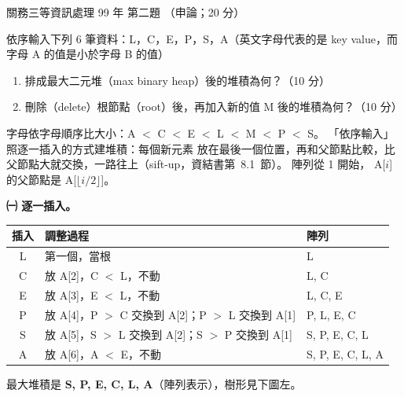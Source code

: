 \begin{pastexam}[label={px:gw3-099-ds-02}]{關務三等資訊處理 99 年 第二題}
（申論；20 分）

依序輸入下列 6 筆資料：L，C，E，P，S，A（英文字母代表的是 key value，而字母 A 的值是小於字母 B 的值）
\begin{enumerate}[leftmargin=2.2em]
\item[㈠] 排成最大二元堆（max binary heap）後的堆積為何？（10 分）
\item[㈡] 刪除（delete）根節點（root）後，再加入新的值 M 後的堆積為何？（10 分）
\end{enumerate}
\end{pastexam}

\begin{pastsoln}
字母依字母順序比大小：A $<$ C $<$ E $<$ L $<$ M $<$ P $<$ S。 「依序輸入」照逐一插入的方式建堆積：每個新元素
放在最後一個位置，再和父節點比較，比父節點大就交換，一路往上（sift-up，資結書第~8.1~節）。 陣列從 1 開始，
A[$i$] 的父節點是 A[$\lfloor i/2 \rfloor$]。

\textbf{㈠ 逐一插入。}
\begin{center}
\begin{tabular}{cll}
\toprule
插入 & 調整過程 & 陣列 \\
\midrule
L & 第一個，當根 & L \\
C & 放 A[2]，C $<$ L，不動 & L, C \\
E & 放 A[3]，E $<$ L，不動 & L, C, E \\
P & 放 A[4]，P $>$ C 交換到 A[2]；P $>$ L 交換到 A[1] & P, L, E, C \\
S & 放 A[5]，S $>$ L 交換到 A[2]；S $>$ P 交換到 A[1] & S, P, E, C, L \\
A & 放 A[6]，A $<$ E，不動 & S, P, E, C, L, A \\
\bottomrule
\end{tabular}
\end{center}
最大堆積是 \textbf{S, P, E, C, L, A}（陣列表示），樹形見下圖左。


\end{pastsoln}
